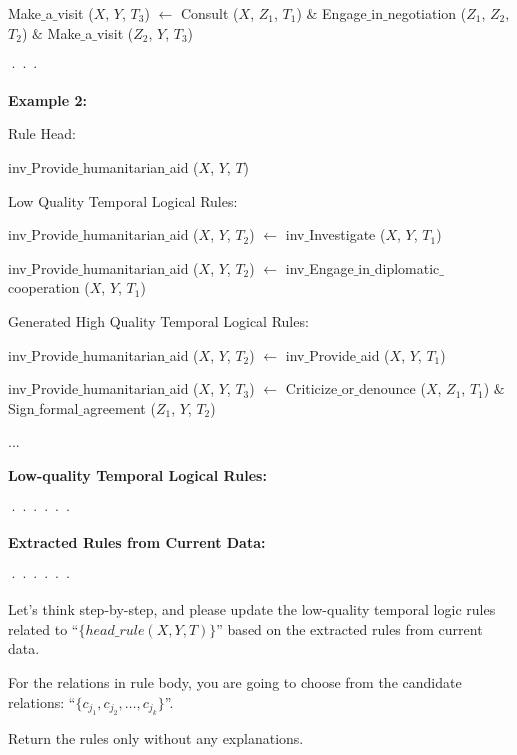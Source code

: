 \documentclass{article}
\begin{document}
\begin{tcolorbox}[colback=white!5!white, colframe=black!75!black, title=Prompt for Dynamic Adaptation]
\hspace*{1cm} Make$\_$a$\_$visit ($X$, $Y$, $T_3$) $\leftarrow$ Consult ($X$, $Z_1$, $T_1$) $\&$ Engage$\_$in$\_$negotiation ($Z_1$, $Z_2$, $T_2$) $\&$ Make$\_$a$\_$visit ($Z_2$, $Y$, $T_3$)

\hspace*{1cm} ···

\textbf{Example 2:}

\hspace*{0.5cm} Rule Head: 

\hspace*{1cm} inv$\_$Provide$\_$humanitarian$\_$aid ($X$, $Y$, $T$)

\hspace*{0.5cm} Low Quality Temporal Logical Rules:

\hspace*{1cm}
inv$\_$Provide$\_$humanitarian$\_$aid ($X$, $Y$, $T_2$) $\leftarrow$ inv$\_$Investigate ($X$, $Y$, $T_1$)

\hspace*{1cm}
inv$\_$Provide$\_$humanitarian$\_$aid ($X$, $Y$, $T_2$) $\leftarrow$ inv$\_$Engage$\_$in$\_$diplomatic$\_$ cooperation ($X$, $Y$, $T_1$)

\hspace*{0.5cm} Generated High Quality Temporal Logical Rules:

\hspace*{1cm} inv$\_$Provide$\_$humanitarian$\_$aid ($X$, $Y$, $T_2$) $\leftarrow$ inv$\_$Provide$\_$aid ($X$, $Y$, $T_1$)

\hspace*{1cm} inv$\_$Provide$\_$humanitarian$\_$aid ($X$, $Y$, $T_3$) $\leftarrow$ Criticize$\_$or$\_$denounce ($X$, $Z_1$, $T_1$) $\&$ Sign$\_$formal$\_$agreement ($Z_1$, $Y$, $T_2$)

\hspace*{1cm} ...

\bigskip
\textbf{Low-quality Temporal Logical Rules:}

\hspace*{0.5cm} ······
\bigskip

\textbf{Extracted Rules from Current Data:}

\hspace*{0.5cm} ······

\bigskip
\hspace*{0.5cm} Let's think step-by-step, and please update the low-quality temporal logic rules related to ``$\{head\_rule (X,Y,T)\}$'' based on the extracted rules from current data.

\hspace*{0.5cm} For the relations in rule body, you are going to choose from the candidate relations: ``$\{c_{j_1}, c_{j_2}, \ldots, c_{j_k}\}$''.

\bigskip
\hspace*{0.5cm} Return the rules only without any explanations.
\end{tcolorbox}
\end{document}
